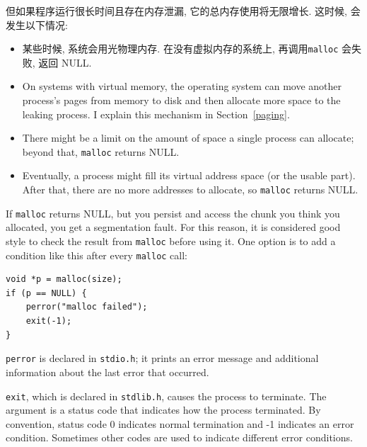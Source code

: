 \documentclass[12pt]{book}
\begin{document}
{%
但如果程序运行很长时间且存在内存泄漏, 它的总内存使用将无限增长. 
这时候, 会发生以下情况:

\begin{itemize}

\item 某些时候, 系统会用光物理内存. 在没有虚拟内存的系统上, 
  再调用{\tt malloc} 会失败, 返回 NULL.

\item On systems with virtual memory, the operating system can move
  another process's pages from memory to disk and then allocate
  more space to the leaking process.  I explain this mechanism
  in Section~\ref{paging}.

\item There might be a limit on the amount of space a single
  process can allocate; beyond that, {\tt malloc} returns NULL.

\item Eventually, a process might fill its virtual address space (or
  the usable part).  After that, there are no more addresses to
  allocate, so {\tt malloc} returns NULL.

\end{itemize}

If {\tt malloc} returns NULL, but you persist and access
the chunk you think you allocated, you get a segmentation fault.
For this reason, it is considered good style to check the result from
{\tt malloc} before using it.  One option is to add a condition like
this after every {\tt malloc} call:

\begin{verbatim}
void *p = malloc(size);
if (p == NULL) {
    perror("malloc failed");
    exit(-1);
}
\end{verbatim}

{\tt perror} is declared in {\tt stdio.h}; it prints
an error message and additional information about the last error
that occurred.

{\tt exit}, which is declared in {\tt stdlib.h}, causes the process
to terminate.  The argument is a status code that indicates how
the process terminated.  By convention, status code 0 indicates normal
termination and -1 indicates an error condition.  Sometimes other
codes are used to indicate different error conditions.

}
\end{document}
